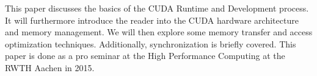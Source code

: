 This paper discusses the basics of the CUDA Runtime and Development process.
It will furthermore introduce the reader into the CUDA hardware architecture and memory management. We will then explore some memory transfer and access optimization techniques.
Additionally, synchronization is briefly covered.
This paper is done as a pro seminar at the High Performance Computing at the RWTH Aachen in 2015.
